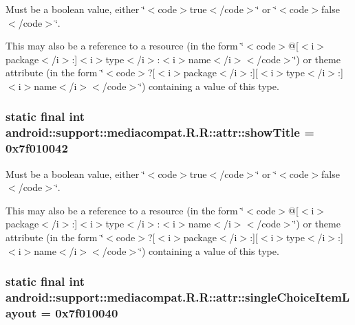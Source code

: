 Must be a boolean value, either \char`\"{}$<$code$>$true$<$/code$>$\char`\"{} or \char`\"{}$<$code$>$false$<$/code$>$\char`\"{}. 

This may also be a reference to a resource (in the form \char`\"{}$<$code$>$@\mbox{[}$<$i$>$package$<$/i$>$:\mbox{]}$<$i$>$type$<$/i$>$:$<$i$>$name$<$/i$>$$<$/code$>$\char`\"{}) or theme attribute (in the form \char`\"{}$<$code$>$?\mbox{[}$<$i$>$package$<$/i$>$:\mbox{]}\mbox{[}$<$i$>$type$<$/i$>$:\mbox{]}$<$i$>$name$<$/i$>$$<$/code$>$\char`\"{}) containing a value of this type. \hypertarget{classandroid_1_1support_1_1mediacompat_1_1_r_1_1attr_1d4933a059c972c8deee2bc3c1ad60c1}{
\subsubsection[{showTitle}]{\setlength{\rightskip}{0pt plus 5cm}static final int android::support::mediacompat.R.R::attr::showTitle = 0x7f010042}}
\label{classandroid_1_1support_1_1mediacompat_1_1_r_1_1attr_1d4933a059c972c8deee2bc3c1ad60c1}


Must be a boolean value, either \char`\"{}$<$code$>$true$<$/code$>$\char`\"{} or \char`\"{}$<$code$>$false$<$/code$>$\char`\"{}. 

This may also be a reference to a resource (in the form \char`\"{}$<$code$>$@\mbox{[}$<$i$>$package$<$/i$>$:\mbox{]}$<$i$>$type$<$/i$>$:$<$i$>$name$<$/i$>$$<$/code$>$\char`\"{}) or theme attribute (in the form \char`\"{}$<$code$>$?\mbox{[}$<$i$>$package$<$/i$>$:\mbox{]}\mbox{[}$<$i$>$type$<$/i$>$:\mbox{]}$<$i$>$name$<$/i$>$$<$/code$>$\char`\"{}) containing a value of this type. \hypertarget{classandroid_1_1support_1_1mediacompat_1_1_r_1_1attr_484058fe92f20c0c8950560cd0c1bd97}{
\subsubsection[{singleChoiceItemLayout}]{\setlength{\rightskip}{0pt plus 5cm}static final int android::support::mediacompat.R.R::attr::singleChoiceItemLayout = 0x7f010040}}
\label{classandroid_1_1support_1_1mediacompat_1_1_r_1_1attr_484058fe92f20c0c8950560cd0c1bd97}


